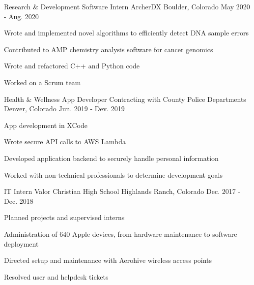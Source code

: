 \begin{cventries}
  \cventry
    {Research \& Development Software Intern}
    {ArcherDX}
    {Boulder, Colorado}
    {May 2020 - Aug. 2020}
    {
      \begin{cvitems}
        \item {Wrote and implemented novel algorithms to efficiently detect DNA sample errors}
        \item {Contributed to AMP chemistry analysis software for cancer genomics}
        \item {Wrote and refactored C++ and Python code}
        \item {Worked on a Scrum team}
      \end{cvitems}
    }

  \cventry
    {Health \& Wellness App Developer}
    {Contracting with County Police Departments}
    {Denver, Colorado}
    {Jun. 2019 - Dev. 2019}
    {
      \begin{cvitems}
        \item {App development in XCode}
        \item {Wrote secure API calls to AWS Lambda}
        \item {Developed application backend to securely handle personal information}
        \item {Worked with non-technical professionals to determine development goals}
      \end{cvitems}
    }

  \cventry
    {IT Intern}
    {Valor Christian High School}
    {Highlands Ranch, Colorado}
    {Dec. 2017 - Dec. 2018}
    {
      \begin{cvitems}
        \item {Planned projects and supervised interns}
        \item {Administration of 640 Apple devices, from hardware maintenance to software deployment}
        \item {Directed setup and maintenance with Aerohive wireless access points}
        \item {Resolved user and helpdesk tickets}
      \end{cvitems}
    }

\end{cventries}
